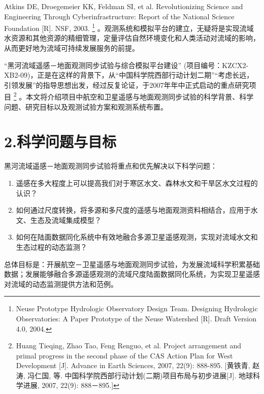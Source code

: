 \documentclass[letterpaper,10pt,english]{sphinxmanual}
\begin{document}
{Atkins DE, Droegemeier KK, Feldman SI, et al. Revolutionizing Science and Engineering Through Cyberinfrastructure: Report of the National Science Foundation {[}R{]}. NSF, 2003.
} \footnote{
Neuse Prototype Hydrologic Observatory Design Team. Designing Hydrologic Observatories: A Paper Prototype of the Neuse Watershed {[}R{]}. Draft Version 4.0, 2004.
} 。观测系统和模拟平台的建立，无疑将是实现流域水资源和其他资源的精细管理，定量评估自然环境变化和人类活动对流域的影响，从而更好地为流域可持续发展服务的前提。

“黑河流域遥感－地面观测同步试验与综合模拟平台建设” (项目编号：KZCX2-XB2-09)，正是在这样的背景下，从“中国科学院西部行动计划二期”“考虑长远，引领发展”的指导思想出发，经过反复论证，于2007年年中正式启动的重点研究项目 \footnote{
Huang Tieqing, Zhao Tao, Feng Renguo, et al. Project arrangement and primal progress in the second phase of the CAS Action Plan for West Development {[}J{]}. Advance in Earth Sciences, 2007, 22(9): 888-895. {[}黄铁青, 赵涛, 冯仁国, 等. 中国科学院西部行动计划(二期)项目布局与初步进展{[}J{]}. 地球科学进展, 2007, 22(9): 888－895.{]}
} 。本文将介绍项目中航空和卫星遥感与地面观测同步试验的科学背景、科学问题、研究目标以及观测试验方案和观测系统布置。


\section{2.科学问题与目标}
\label{water_aims:id20}
黑河流域遥感－地面观测同步试验将重点和优先解决以下科学问题：
\begin{enumerate}
\item {} 
遥感在多大程度上可以提高我们对于寒区水文、森林水文和干旱区水文过程的认识？

\item {} 
如何通过尺度转换，将多源和多尺度的遥感与地面观测资料相结合，应用于水文、生态及流域集成模型？

\item {} 
如何在陆面数据同化系统中有效地融合多源卫星遥感观测，实现对流域水文和生态过程的动态监测？

\end{enumerate}

总体目标是：开展航空－卫星遥感与地面观测同步试验，为发展流域科学积累基础数据；发展能够融合多源遥感观测的流域尺度陆面数据同化系统，为实现卫星遥感对流域的动态监测提供方法和范例。
\end{document}
